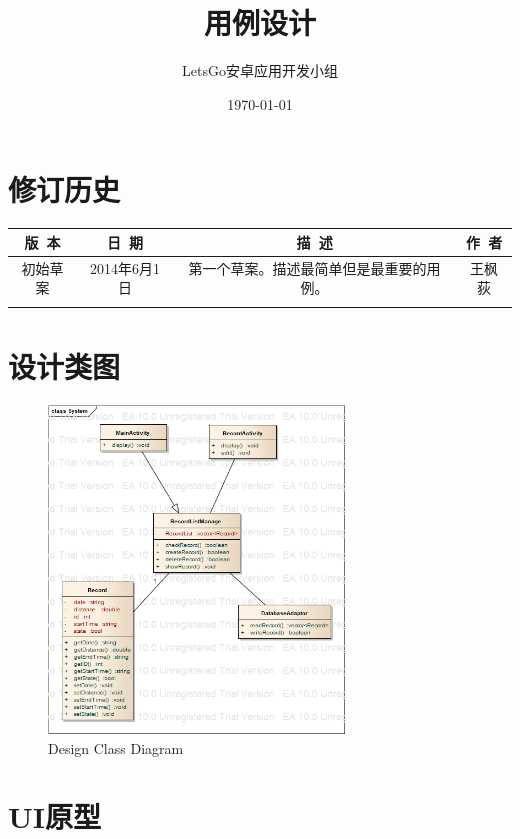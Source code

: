 \documentclass [a4paper,11pt]{article}
\title{用例设计}
\date{\today}
\author{LetsGo安卓应用开发小组}
\begin{document}
	
\maketitle
\section*{修订历史}

\begin{table}[!hbp]
\centering

\begin{tabular*}{\textwidth}{c|c|c|c}
\hline
\rule{0pt}{0.8cm}
版~本 & 日~期 & 描~述 & 作~者\\
\hline
\rule{0pt}{0.6cm}
初始草案 & 2014年6月1日 & 第一个草案。描述最简单但是最重要的用例。 & 王枫荻\\
\hline
\rule{0pt}{0.6cm}
 &  &  & \\
\hline
\end{tabular*}

\end{table}

\section*{设计类图}

\begin{figure}[ht!]
			\centering
			\includegraphics[width=0.7\textwidth]{83}
			\caption{Design Class Diagram}
			\label{mylabel1}
		\end{figure}
		
\section*{UI原型}
\end{document}
